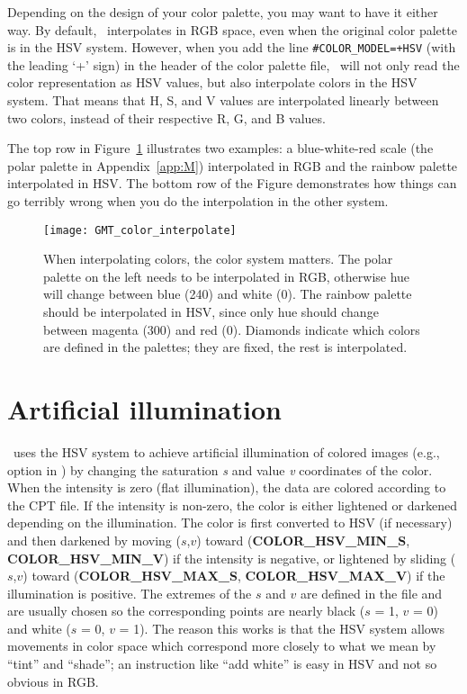 Depending on the design of your color palette, you may want to have it either way. By default, \GMT\ interpolates in RGB space, even when the original color palette is in the HSV system. However, when you add the line \texttt{\#COLOR\_MODEL=+HSV} (with the leading `+' sign) in the header of the color palette file, \GMT\ will not only read the color representation as HSV values, but also interpolate colors in the HSV system. That means that H, S, and V values are interpolated linearly between two colors, instead of their respective R, G, and B values.

The top row in Figure~\ref{fig:GMT_color_interpolate} illustrates two examples: a blue-white-red scale (the \textsf{polar} palette in Appendix~\ref{app:M}) interpolated in RGB and the \textsf{rainbow} palette interpolated in HSV. The bottom row of the Figure demonstrates how things can go terribly wrong when you do the interpolation in the other system.

\begin{figure}[h]
   \centering
   \texttt{[image: GMT\_color\_interpolate]}%
   \caption{When interpolating colors, the color system matters. The polar palette on the left needs to be interpolated in RGB, otherwise hue will change between blue (240\DS) and white (0\DS). The rainbow palette should be interpolated in HSV, since only hue should change between magenta (300\DS) and red (0\DS). Diamonds indicate which colors are defined in the palettes; they are fixed, the rest is interpolated.}
   \label{fig:GMT_color_interpolate}
\end{figure}

\section{Artificial illumination}
\GMT\ uses the HSV system to
achieve artificial illumination of colored images (e.g., 
option in ) by changing the saturation \emph{s} and value \emph{v}
coordinates of the color.  When the intensity is zero (flat illumination), the data
are colored according to the CPT file.  If the intensity is
non-zero, the color is either lightened or darkened depending on the illumination.
The color is first converted to HSV (if necessary) and then
darkened by moving ($s$,$v$) toward (\textbf{COLOR\_HSV\_MIN\_S},
\textbf{COLOR\_HSV\_MIN\_V}) if the intensity is negative, or lightened by sliding ($s$,$v$) toward
(\textbf{COLOR\_HSV\_MAX\_S}, \textbf{COLOR\_HSV\_MAX\_V}) if the illumination is positive.
The extremes of the $s$ and $v$ are defined in the  file and are usually
chosen so the corresponding points are nearly black ($s$ = 1,
$v$ = 0) and white ($s$ = 0, $v$ = 1).
The reason this works is that the HSV system allows movements in
color space which correspond more closely to what we mean by
``tint'' and ``shade''; an instruction like ``add white'' is
easy in HSV and not so obvious in RGB.

